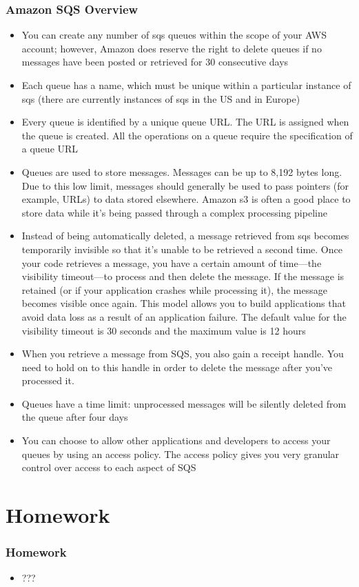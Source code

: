 \documentclass{beamer}
\begin{document}
\begin{frame}
\frametitle{Amazon SQS Overview}
\begin{itemize}
\item You can create any number of \acrshort{sqs} queues within the scope of your AWS account;
however, Amazon does reserve the right to delete queues if no messages have been
posted or retrieved for 30 consecutive days

\item Each queue has a name, which must be unique within a particular instance of \acrshort{sqs}
(there are currently instances of \acrshort{sqs} in the US and in Europe)
\item Every queue is identified by a unique queue URL. The URL is assigned when the
queue is created. All the operations on a queue require the specification of a queue
URL
\item Queues are used to store messages. Messages can be up to 8,192 bytes long. Due to
this low limit, messages should generally be used to pass pointers (for example,
URLs) to data stored elsewhere. Amazon \acrshort{s3} is often a good place to store data while
it’s being passed through a complex processing pipeline

\item Instead of being automatically deleted, a message retrieved from \acrshort{sqs} becomes
temporarily invisible so that it’s unable to be retrieved a second time. Once your
code retrieves a message, you have a certain amount of time—the visibility
timeout—to process and then delete the message. If the message is retained (or if
your application crashes while processing it), the message becomes visible once
again. This model allows you to build applications that avoid data loss as a result
of an application failure. The default value for the visibility timeout is 30 seconds
and the maximum value is 12 hours

\item When you retrieve a message from SQS, you also gain a receipt handle. You need
to hold on to this handle in order to delete the message after you’ve processed it.

\item Queues have a time limit: unprocessed messages will be silently deleted from the
queue after four days

\item You can choose to allow other applications and developers to access your queues
by using an access policy. The access policy gives you very granular control over
access to each aspect of SQS

\end{itemize}

\end{frame}


\section{Homework}
\begin{frame}[fragile]
\frametitle{Homework}
\begin{itemize}
\item ???
\end{itemize}
\end{frame}
\end{document}
